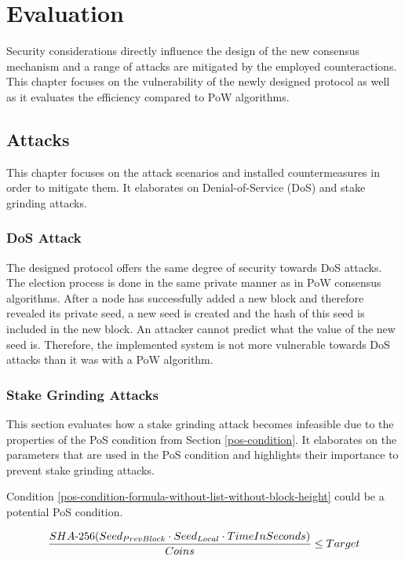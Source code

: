 \chapter{Evaluation}
Security considerations directly influence the design of the new consensus mechanism and a range of attacks are mitigated by the employed counteractions. This chapter focuses on the vulnerability of the newly designed protocol as well as it evaluates the efficiency compared to PoW algorithms. 

\section{Attacks}

This chapter focuses on the attack scenarios and installed countermeasures in order to mitigate them. It elaborates on Denial-of-Service (DoS) and stake grinding attacks.

\subsection{DoS Attack}
The designed protocol offers the same degree of security towards DoS attacks. The election process is done in the same private manner as in PoW consensus algorithms. After a node has successfully added a new block and therefore revealed its private seed, a new seed is created and the hash of this seed is included in the new block. An attacker cannot predict what the value of the new seed is. Therefore, the implemented system is not more vulnerable towards DoS attacks than it was with a PoW algorithm.


\subsection{Stake Grinding Attacks}\label{stake-grinding-attacks}
This section evaluates how a stake grinding attack becomes infeasible due to the properties of the PoS condition from Section \ref{pos-condition}. It elaborates on the parameters that are used in the PoS condition and highlights their importance to prevent stake grinding attacks.

Condition \ref{pos-condition-formula-without-list-without-block-height} could be a potential PoS condition. 

\begin{equation} 
\label{pos-condition-formula-without-list-without-block-height}
\frac{SHA{\text -}256(Seed_{PrevBlock} \cdot Seed_{Local} \cdot TimeInSeconds)}{Coins} \leq Target
\end{equation}

